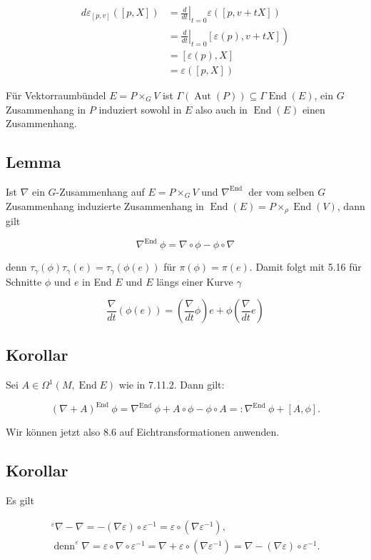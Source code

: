 \documentclass[10pt, letterpaper]{article}
\begin{document}
$$
\begin{aligned}
d \varepsilon_{[p, v]}([p, X]) & =\left.\frac{d}{d t}\right|_{t=0} \varepsilon([p, v+t X]) \\
& \left.=\left.\frac{d}{d t}\right|_{t=0}[\varepsilon(p), v+t X]\right) \\
& =[\varepsilon(p), X] \\
& =\varepsilon([p, X])
\end{aligned}
$$

Für Vektorraumbündel $E=P \times_{G} V$ ist $\Gamma(\operatorname{Aut}(P)) \subseteq \Gamma \operatorname{End}(E)$, ein $G$ Zusammenhang in $P$ induziert sowohl in $E$ also auch in $\operatorname{End}(E)$ einen Zusammenhang.

\subsection*{Lemma}
Ist $\nabla$ ein $G$-Zusammenhang auf $E=P \times_{G} V$ und $\nabla^{\text {End }}$ der vom selben $G$ Zusammenhang induzierte Zusammenhang in $\operatorname{End}(E)=P \times_{\rho} \operatorname{End}(V)$, dann gilt

$$
\nabla^{\text {End }} \phi=\nabla \circ \phi-\phi \circ \nabla
$$

denn $\tau_{\gamma}(\phi) \tau_{\gamma}(e)=\tau_{\gamma}(\phi(e))$ für $\pi(\phi)=\pi(e)$. Damit folgt mit 5.16 für Schnitte $\phi$ und $e$ in End $E$ und $E$ längs einer Kurve $\gamma$

$$
\frac{\nabla}{d t}(\phi(e))=\left(\frac{\nabla}{d t} \phi\right) e+\phi\left(\frac{\nabla}{d t} e\right)
$$

\subsection*{Korollar}
Sei $A \in \Omega^{1}(M, \operatorname{End} E)$ wie in 7.11.2. Dann gilt:

$$
(\nabla+A)^{\text {End }} \phi=\nabla^{\text {End }} \phi+A \circ \phi-\phi \circ A=: \nabla^{\text {End }} \phi+[A, \phi] .
$$

Wir können jetzt also 8.6 auf Eichtransformationen anwenden.

\subsection*{Korollar}
Es gilt

$$
\begin{array}{r}
{ }^{\varepsilon} \nabla-\nabla=-(\nabla \varepsilon) \circ \varepsilon^{-1}=\varepsilon \circ\left(\nabla \varepsilon^{-1}\right), \\
\operatorname{denn}^{\varepsilon} \nabla=\varepsilon \circ \nabla \circ \varepsilon^{-1}=\nabla+\varepsilon \circ\left(\nabla \varepsilon^{-1}\right)=\nabla-(\nabla \varepsilon) \circ \varepsilon^{-1} .
\end{array}
$$
\end{document}
